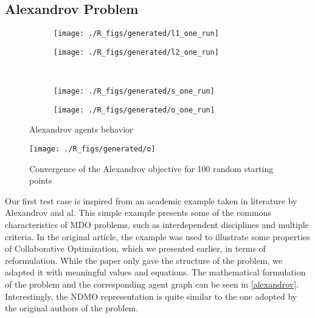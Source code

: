 \subsection{Alexandrov Problem}

\begin{figure}[]
\centering
  	\begin{subfigure}[b]{0.4\textwidth}
		\centering
		\texttt{[image: ./R\_figs/generated/l1\_one\_run]}
		\label{alexandrov_res_one:l1}
	\end{subfigure}
	\begin{subfigure}[b]{0.4\textwidth}
		\centering
		\texttt{[image: ./R\_figs/generated/l2\_one\_run]}
		\label{alexandrov_res_one:l2}
	\end{subfigure}
	\vspace{-20pt}
	\\
	\begin{subfigure}[b]{0.4\textwidth}
		\centering
		\texttt{[image: ./R\_figs/generated/s\_one\_run]}
		\label{alexandrov_res_one:s}
	\end{subfigure}
	\begin{subfigure}[b]{0.4\textwidth}
		\centering
		\texttt{[image: ./R\_figs/generated/o\_one\_run]}
		\label{alexandrov_res_one:o}
	\end{subfigure}
	
	\caption{Alexandrov agents behavior}
	\label{alexandrov_res_one}

\end{figure}

\begin{wrapfigure}{R}{0.4\textwidth}
    \texttt{[image: ./R\_figs/generated/o]}
	\caption{Convergence of the Alexandrov objective for 100 random starting points}
	\label{alexandrov_res}
\end{wrapfigure}

Our first test case is inspired from an academic example taken in literature by Alexandrov and al\cite{alexandrov2002analytical}. This simple example presents some of the commons characteristics of MDO problems, such as interdependent disciplines and multiple criteria. In the original article, the example was used to illustrate some properties of Collaborative Optimization, which we presented earlier, in terms of reformulation. While the paper only gave the structure of the problem, we adapted it with meaningful values and equations.
The mathematical formulation of the problem and the corresponding agent graph can be seen in \figurename \ref{alexandrov}. Interestingly, the NDMO representation is quite similar to the one adopted by the original authors of the problem.

